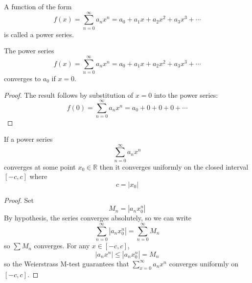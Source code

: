 \begin{definition} A function of the form
\[
f(x) = \sum_{n=0}^\infty a_nx^n = a_0+a_1x+a_2x^2+a_3x^3+\cdots
\]
is called a power series.
\end{definition}
\begin{theorem}
The power series
\[
f(x) = \sum_{n=0}^\infty a_nx^n = a_0+a_1x+a_2x^2+a_3x^3+\cdots
\]
converges to $a_0$ if $x=0$.
\end{theorem}
\begin{proof}
The result follows by substitution of $x=0$ into the power series:
\[
f(0) = \sum_{n=0}^\infty a_nx^n = a_0+0+0+0+\cdots
\]
\end{proof}
\begin{theorem}
If a power series
\[
\sum_{n=0}^\infty a_nx^n
\]
converges at some point $x_0\in\mathbb{R}$ then it converges uniformly on the closed interval $[-c,c]$ where
\[
c = |x_0|
\]
\end{theorem}
\begin{proof}
Set
\[
M_n = |a_nx_0^n|
\]
By hypothesis, the series converges absolutely, so we can write
\[
\sum_{n=0}^\infty |a_nx_0^n| = \sum_{n=0}^\infty M_n
\]
so $\sum M_n$ converges.  For any $x\in[-c,c]$,
\[
|a_nx^n|\leq|a_nx_0^n|= M_n
\]
so the Weierstrass M-test guarantees that $\sum_{x=0}^\infty a_nx^n$ converges uniformly on $[-c,c]$. 
\end{proof}
